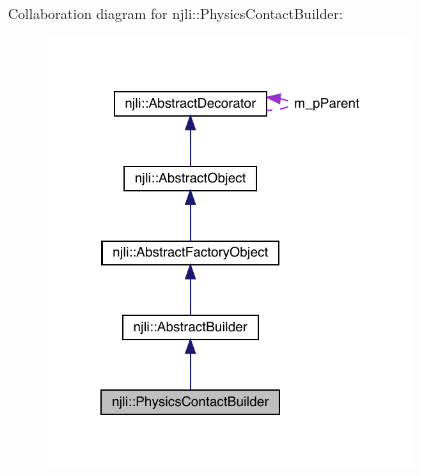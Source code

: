 Collaboration diagram for njli\+:\+:Physics\+Contact\+Builder\+:\nopagebreak
\begin{figure}[H]
\begin{center}
\leavevmode
\includegraphics[width=274pt]{classnjli_1_1_physics_contact_builder__coll__graph}
\end{center}
\end{figure}
